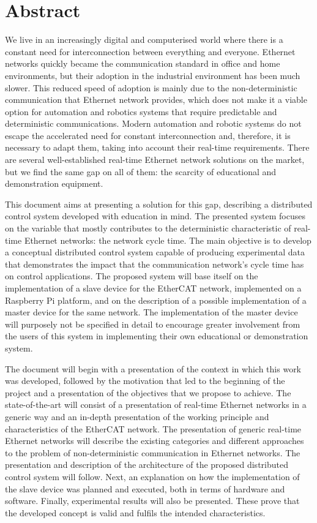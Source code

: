 \chapter*{Abstract}
We live in an increasingly digital and computerised world where there is a constant need for interconnection between everything and everyone.
Ethernet networks quickly became the communication standard in office and home environments, but their adoption in the industrial environment has been much slower.
This reduced speed of adoption is mainly due to the non-deterministic communication that Ethernet network provides, which does not make it a viable option for automation and robotics systems that require predictable and deterministic communications.
Modern automation and robotic systems do not escape the accelerated need for constant interconnection and, therefore, it is necessary to adapt them, taking into account their real-time requirements.
There are several well-established real-time Ethernet network solutions on the market, but we find the same gap on all of them: the scarcity of educational and demonstration equipment.

This document aims at presenting a solution for this gap, describing a distributed control system developed with education in mind.
The presented system focuses on the variable that mostly contributes to the deterministic characteristic of real-time Ethernet networks: the network cycle time.
The main objective is to develop a conceptual distributed control system capable of producing experimental data that demonstrates the impact that the communication network's cycle time has on control applications.
The proposed system will base itself on the implementation of a slave device for the EtherCAT network, implemented on a Raspberry Pi platform, and on the description of a possible implementation of a master device for the same network.
The implementation of the master device will purposely not be specified in detail to encourage greater involvement from the users of this system in implementing their own educational or demonstration system.

The document will begin with a presentation of the context in which this work was developed, followed by the motivation that led to the beginning of the project and a presentation of the objectives that we propose to achieve.
The state-of-the-art will consist of a presentation of real-time Ethernet networks in a generic way and an in-depth presentation of the working principle and characteristics of the EtherCAT network.
The presentation of generic real-time Ethernet networks will describe the existing categories and different approaches to the problem of non-deterministic communication in Ethernet networks.
The presentation and description of the architecture of the proposed distributed control system will follow.
Next, an explanation on how the implementation of the slave device was planned and executed, both in terms of hardware and software.
Finally, experimental results will also be presented.
These prove that the developed concept is valid and fulfils the intended characteristics.


